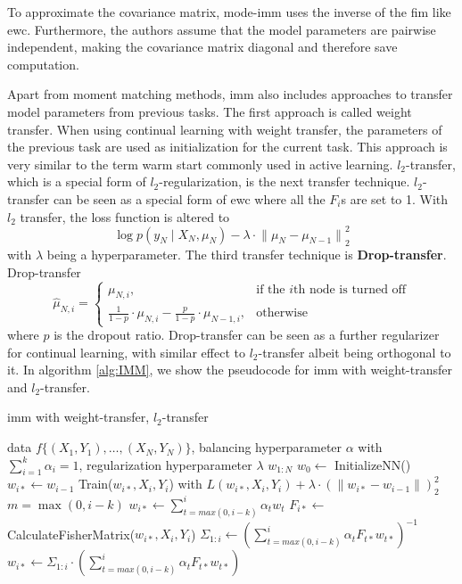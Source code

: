 To approximate the covariance matrix, mode-\gls{imm} uses the inverse of the \gls{fim} like \gls{ewc}. Furthermore, the authors assume that
the model parameters are pairwise independent, making the covariance matrix diagonal and therefore save computation. \par
Apart from moment matching methods, \gls{imm} also includes approaches to transfer model parameters from previous tasks. The first approach is called
weight transfer. When using continual learning with weight transfer, the parameters of the previous task are used as initialization for the
current task. This approach is very similar to the term warm start commonly used in active learning. $l_2$-transfer, which is a special form of 
$l_2$-regularization, is the next transfer technique. $l_2$-transfer can be seen as a special form of \gls{ewc} where all the $F_i$s are set to 1. 
With $l_2$ transfer, the loss function is altered to
\begin{equation}
    \log p(y_N \mid X_N, \mu_N) - \lambda \cdot {\lVert \mu_N - \mu_{N-1} \rVert}^2_2
\end{equation}
with $\lambda$ being a hyperparameter. The third transfer technique is \textbf{Drop-transfer}. Drop-transfer
\begin{equation}
    \hat{\mu}_{N,i} = \begin{cases} \mu_{N,i}, & \text{if the }i \text{th node is turned off} \\
    \frac{1}{1-p} \cdot \mu_{N,i} - \frac{p}{1-p} \cdot \mu_{N-1,i}, & \text{otherwise}  \end{cases}
\end{equation}
where $p$ is the dropout ratio. Drop-transfer can be seen as a further regularizer for continual learning, with similar effect to $l_2$-transfer albeit
being orthogonal to it. In algorithm \ref{alg:IMM}, we show the pseudocode for \gls{imm} with weight-transfer and $l_2$-transfer. \par

\begin{algorithm}
    \caption{\gls{imm} with weight-transfer, $l_2$-transfer} \label{alg:IMM}
    \begin{algorithmic}
        \Require data $f\{ (X_1,Y_1),\ldots,(X_N,Y_N)\}$, balancing hyperparameter $\alpha$ with $\sum_{i=1}^k \alpha_i = 1$,
        regularization hyperparameter $\lambda$
        \return $w_{1:N}$
        \State $w_0 \leftarrow $ InitializeNN()
            \State $w_{i*} \leftarrow w_{i-1}$
            \State Train($w_{i*},X_i,Y_i$) with $L(w_{i*},X_i,Y_i) + \lambda \cdot (\lVert w_{i*} - w_{i-1} \rVert)^2_2$
            \State $m=\max (0,i-k)$
            \State $w_{i*} \leftarrow \sum_{t=max(0,i-k)}^i \alpha_t w_{t}$
            \State $F_{i*} \leftarrow$ CalculateFisherMatrix($w_{i*},X_i,Y_i$)
            \State $\Sigma_{1:i} \leftarrow (\sum_{t=max(0,i-k)}^i \alpha_t F_{t*} w_{t*})^{-1}$
            \State $w_{i*} \leftarrow \Sigma_{1:i} \cdot (\sum_{t=max(0,i-k)}^i \alpha_t F_{t*} w_{t*})$
            \EndIf
        \EndFor
    \end{algorithmic}
\end{algorithm}

